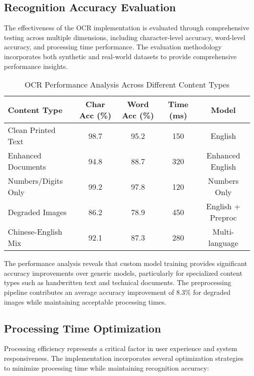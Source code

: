 \subsection{Recognition Accuracy Evaluation}

The effectiveness of the OCR implementation is evaluated through comprehensive testing across multiple dimensions, including character-level accuracy, word-level accuracy, and processing time performance. The evaluation methodology incorporates both synthetic and real-world datasets to provide comprehensive performance insights.

\begin{table}[H]
\centering
\caption{OCR Performance Analysis Across Different Content Types}
\label{tab:ocr_performance}
{\begin{tabular}{lcccc}
\toprule
\textbf{Content Type} & \textbf{Char Acc (\%)} & \textbf{Word Acc (\%)} & \textbf{Time (ms)} & \textbf{Model} \\
\midrule
Clean Printed Text & 98.7 & 95.2 & 150 & English \\
Enhanced Documents & 94.8 & 88.7 & 320 & Enhanced English \\
Numbers/Digits Only & 99.2 & 97.8 & 120 & Numbers Only \\
Degraded Images & 86.2 & 78.9 & 450 & English + Preproc \\
Chinese-English Mix & 92.1 & 87.3 & 280 & Multi-language \\
\bottomrule
\end{tabular}}
\end{table}

The performance analysis reveals that custom model training provides significant accuracy improvements over generic models, particularly for specialized content types such as handwritten text and technical documents. The preprocessing pipeline contributes an average accuracy improvement of 8.3\% for degraded images while maintaining acceptable processing times.

\subsection{Processing Time Optimization}

Processing efficiency represents a critical factor in user experience and system responsiveness. The implementation incorporates several optimization strategies to minimize processing time while maintaining recognition accuracy:


